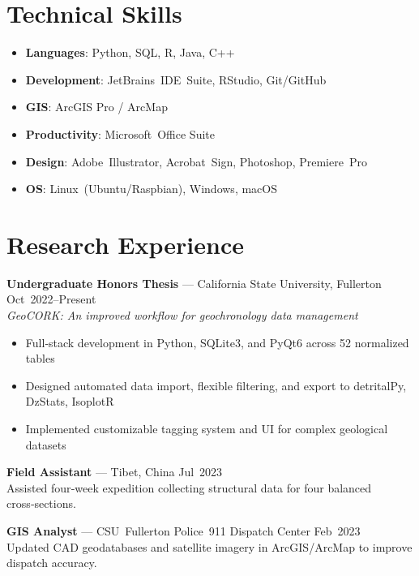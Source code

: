 \documentclass[margin]{res}
\begin{document}
\section{Technical Skills}
\begin{itemize}[noitemsep, topsep=2pt]
  \item \textbf{Languages}: Python, SQL, R, Java, C++
  \item \textbf{Development}: JetBrains IDE Suite, RStudio, Git/GitHub
  \item \textbf{GIS}: ArcGIS Pro / ArcMap
  \item \textbf{Productivity}: Microsoft Office Suite
  \item \textbf{Design}: Adobe Illustrator, Acrobat Sign, Photoshop, Premiere Pro
  \item \textbf{OS}: Linux (Ubuntu/Raspbian), Windows, macOS
\end{itemize}

\section{Research Experience}
\textbf{Undergraduate Honors Thesis} — California State University, Fullerton \hfill Oct 2022–Present\\
\emph{GeoCORK: An improved workflow for geochronology data management}
\begin{itemize}[leftmargin=*, noitemsep]
  \item Full‑stack development in Python, SQLite3, and PyQt6 across 52 normalized tables
  \item Designed automated data import, flexible filtering, and export to detritalPy, DzStats, IsoplotR
  \item Implemented customizable tagging system and UI for complex geological datasets
\end{itemize}

\textbf{Field Assistant} — Tibet, China \hfill Jul 2023\\
Assisted four‑week expedition collecting structural data for four balanced cross‑sections.

\textbf{GIS Analyst} — CSU Fullerton Police 911 Dispatch Center \hfill Feb 2023\\
Updated CAD geodatabases and satellite imagery in ArcGIS/ArcMap to improve dispatch accuracy.
\end{document}
